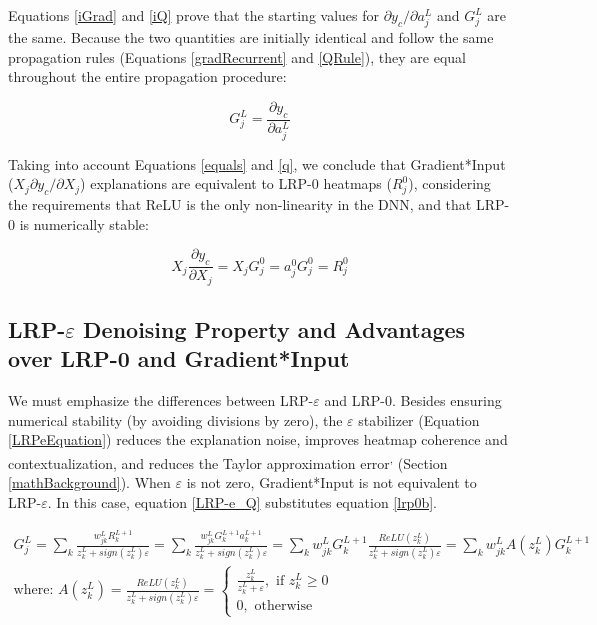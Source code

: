 \documentclass[fleqn,10pt]{wlscirep}
\begin{document}
{Equations \ref{iGrad} and \ref{iQ} prove that the starting values for $\partial y_{c}/\partial a_{j}^{L}$ and $G_{j}^{L}$ are the same. Because the two quantities are initially identical and follow the same propagation rules (Equations \ref{gradRecurrent} and \ref{QRule}), they are equal throughout the entire propagation procedure:

\begin{equation}
\label{equals}
G_{j}^{L}=\frac{\partial y_{c}}{\partial a_{j}^{L}}
\end{equation}

Taking into account Equations \ref{equals} and \ref{q}, we conclude that Gradient*Input ($X_{j}\partial y_{c}/\partial X_{j}$) explanations are equivalent to LRP-0 heatmaps ($R_{j}^{0}$), considering the requirements that ReLU is the only non-linearity in the DNN, and that LRP-0 is numerically stable:

\begin{equation}
X_{j}\frac{\partial y_{c}}{\partial X_{j}}=X_{j}G_{j}^{0}=a_{j}^{0}G_{j}^{0}=R_{j}^{0}
\end{equation}

\subsection{LRP-$\varepsilon$ Denoising Property and Advantages over LRP-0 and Gradient*Input}
\label{LRPDenoise}

We must emphasize the differences between LRP-$\varepsilon$ and LRP-0. Besides ensuring numerical stability (by avoiding divisions by zero), the $\varepsilon$ stabilizer (Equation \ref{LRPeEquation}) reduces the explanation noise, improves heatmap coherence and contextualization, and reduces the Taylor approximation error\cite{LRP}\textsuperscript{,}\cite{LRPBook} (Section \ref{mathBackground}). When $\varepsilon$ is not zero, Gradient*Input is not equivalent to LRP-$\varepsilon$. In this case, equation \ref{LRP-e_Q} substitutes equation \ref{lrp0b}.

\begin{gather}
\label{LRP-e_Q}
G_{j}^{L}=\sum_{k}\frac{w_{jk}^{L}R_{k}^{L+1}}{z_{k}^{L}+sign(z_{k}^{L})\varepsilon}=
\sum_{k}\frac{w_{jk}^{L}G_{k}^{L+1}a_{k}^{L+1}}{z_{k}^{L}+sign(z_{k}^{L})\varepsilon}=
\sum_{k}w_{jk}^{L}G_{k}^{L+1}\frac{ReLU(z_{k}^{L})}{z_{k}^{L}+sign(z_{k}^{L})\varepsilon}=
\sum_{k}w_{jk}^{L}A(z_{k}^{L})G_{k}^{L+1} \\
\label{AS}
\mbox{where: } A(z_{k}^{L})=\frac{ReLU(z_{k}^{L})}{z_{k}^{L}+sign(z_{k}^{L})\varepsilon}=
\begin{cases}
\frac{z_{k}^{L}}{z_{k}^{L}+\varepsilon}, \mbox{ if } z_{k}^{L} \geq 0 \\
0,  \mbox{ otherwise }
\end{cases}
\end{gather}

}
\end{document}
